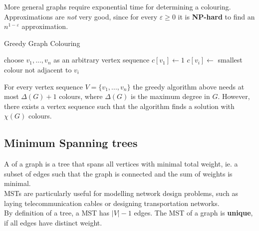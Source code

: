 \documentclass[a3paper, landscape, 11pt]{article} %
\begin{document}
\begin{multicols*}{4}
More general graphs require exponential time for determining a colouring. Approximations are \textit{not} very good, since for every $\varepsilon \ge 0$ it is \textbf{NP-hard} to find an $n^{1-\varepsilon}$ approximation.\\

\begin{algorithm}[H]
\caption{Greedy Graph Colouring}
\begin{algorithmic}[1]
\State choose $v_1,...,v_n$ as an arbitrary vertex sequence
\State $c[v_1] \gets 1$
	\State $c[v_i] \gets$ smallest colour not adjacent to $v_i$
\EndFor
\EndProcedure
\end{algorithmic}
\end{algorithm}
For every vertex sequence $V=\{v_1,...,v_n\}$ the greedy algorithm above needs at most $\Delta(G)+1$ colours, where $\Delta(G)$ is the maximum degree in $G$. However, there exists a vertex sequence such that the algorithm finds a solution with $\chi(G)$ colours.








\newpage
{}
\subsection*{Minimum Spanning trees}

A  of a graph is a tree that spans all vertices with minimal total weight, ie. a subset of edges such that the graph is connected and the sum of weights is minimal.\\

MSTs are particularly useful for modelling network design problems, such as laying telecommunication cables or designing transportation networks.\\

By definition of a tree, a MST has $|V|-1$ edges. The MST of a graph is \textbf{unique}, if all edges have distinct weight.



\end{multicols*}
\end{document}
